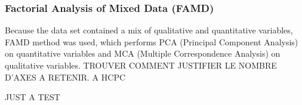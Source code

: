 \subsubsection{Factorial Analysis of Mixed Data (FAMD)}
Because the data set contained a mix of qualitative and quantitative variables, FAMD method was used, which performs PCA (Principal Component Analysis) on quantitative variables and MCA (Multiple Correspondence Analysis) on qualitative variables. TROUVER COMMENT JUSTIFIER LE NOMBRE D'AXES A RETENIR. A HCPC 


JUST A TEST